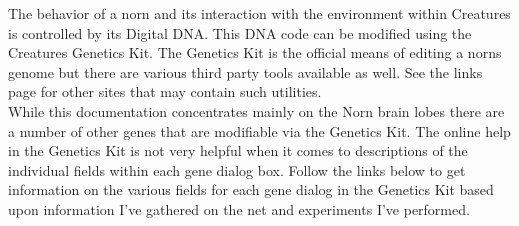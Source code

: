 \documentclass[11pt,twoside,a4paper]{article}
\begin{document}
The behavior of a norn and its interaction with the environment within Creatures is controlled by its Digital DNA. This DNA code can be modified using the Creatures Genetics Kit. The Genetics Kit is the official means of editing a norns genome but there are various third party tools available as well. See the links page for other sites that may contain such utilities.~\\

While this documentation concentrates mainly on the Norn brain lobes there are a number of other genes that are modifiable via the Genetics Kit. The online help in the Genetics Kit is not very helpful when it comes to descriptions of the individual fields within each gene dialog box. Follow the links below to get information on the various fields for each gene dialog in the Genetics Kit based upon information I've gathered on the net and experiments I've performed.~\\
\end{document}
